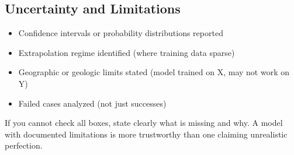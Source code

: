 \documentclass[12pt]{article}
\begin{document}
\subsection{Uncertainty and Limitations}
\begin{itemize}
\item[$\square$] Confidence intervals or probability distributions reported
\item[$\square$] Extrapolation regime identified (where training data sparse)
\item[$\square$] Geographic or geologic limits stated (model trained on X, may not work on Y)
\item[$\square$] Failed cases analyzed (not just successes)
\end{itemize}

If you cannot check all boxes, state clearly what is missing and why. A model with documented limitations is more trustworthy than one claiming unrealistic perfection.
\end{document}
